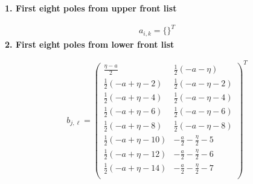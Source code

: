 \documentclass[preview]{standalone}
\begin{document}
\noindent\textbf{1. First eight poles from upper front list}

\begin{align*}
  a_{i,k} = 
  \{\}^T 
\end{align*}
\noindent\textbf{2. First eight poles from lower front list}

\begin{align*}
  b_{j,\ell} = 
  \left(
\begin{array}{cc}
 \frac{\eta -a}{2} & \frac{1}{2} (-a-\eta ) \\
 \frac{1}{2} (-a+\eta -2) & \frac{1}{2} (-a-\eta -2) \\
 \frac{1}{2} (-a+\eta -4) & \frac{1}{2} (-a-\eta -4) \\
 \frac{1}{2} (-a+\eta -6) & \frac{1}{2} (-a-\eta -6) \\
 \frac{1}{2} (-a+\eta -8) & \frac{1}{2} (-a-\eta -8) \\
 \frac{1}{2} (-a+\eta -10) & -\frac{a}{2}-\frac{\eta }{2}-5 \\
 \frac{1}{2} (-a+\eta -12) & -\frac{a}{2}-\frac{\eta }{2}-6 \\
 \frac{1}{2} (-a+\eta -14) & -\frac{a}{2}-\frac{\eta }{2}-7 \\
\end{array}
\right)^T 
\end{align*}
\end{document}
